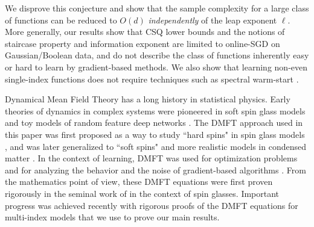 We disprove this conjecture and show that the sample complexity for a large class of functions can be reduced to $O(d)$ {\it independently} of the leap exponent $\ell$. More generally, our results show that CSQ lower bounds and the notions of staircase property and information exponent are limited to online-SGD on Gaussian/Boolean data,  and do not describe the class of functions inherently easy or hard to learn by gradient-based methods. We also show that learning non-even single-index functions does not require techniques such as spectral warm-start \citep{chen2020learning}.

Dynamical Mean Field Theory has a long history in statistical physics. Early theories of dynamics in complex systems were pioneered in soft spin glass models \citep{sompolinsky1981dynamic} and toy models of random feature deep networks \citep{sompolinsky1988chaos}. The DMFT approach used in this paper was first proposed as a way to study ``hard spins" in spin glass models \citep{eissfeller1992new,eissfeller1994mean}, and was later generalized to ``soft spins" \citep{cugliandolo2003dynamics} and more realistic models in condensed matter \citep{georges1996dynamical}. In the context of learning, DMFT was used for optimization problems \citep{mannelli2019who,mannelli2019passed,mannelli2020marvels,mannelli2021just} and for analyzing the behavior and the noise of gradient-based algorithms \citep{mignacco2020dynamical,mignacco2021stochasticity,mignacco2022effective}.  From the mathematics point of view, these DMFT equations were first proven rigorously in the seminal work of \citep{benarous1997symmetric} in the context of spin glasses. Important progress was achieved recently with rigorous proofs of the DMFT equations for multi-index models \citep{celentano2021high,gerbelot2022rigorous} that we use to prove our main results.







